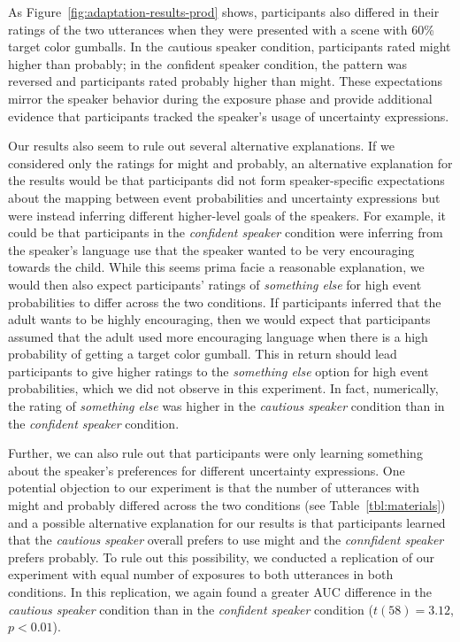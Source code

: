 \documentclass[lucida,biblatex]{sp} %
\begin{document}
As Figure~\ref{fig:adaptation-results-prod} shows, participants also differed in their ratings of the two utterances when they were presented with a scene with 60\% target color gumballs. In the {\emph cautious speaker} condition, participants rated {\sc might} higher than {\sc probably}; in the {\emph confident speaker} condition, the pattern was reversed and participants rated {\sc probably} higher than {\sc might}. These expectations mirror the speaker behavior during the exposure phase and provide additional evidence that participants tracked the speaker's usage of uncertainty expressions. 

Our results also seem to rule out several alternative explanations. If we  considered only the ratings for {\sc might} and {\sc probably}, an alternative explanation for the results would be that participants did not form speaker-specific expectations about the mapping between event probabilities and uncertainty expressions but were instead inferring different higher-level goals of the speakers. For example, it could be that participants in the \emph{confident speaker} condition were inferring from the speaker's language use that the speaker wanted to be very encouraging towards the child. While this seems prima facie a reasonable explanation, we would then also expect participants' ratings of \emph{ something else} for high event probabilities to differ across the two conditions. If participants inferred that the adult wants to be highly encouraging, then we would expect that participants assumed that the adult used more encouraging language when there is a high probability of getting a target color gumball. This in return should lead participants to give higher ratings to the \emph{something else} option for high event probabilities, which we did not observe in this experiment. In fact, numerically, the rating of \emph{something else} was higher in the \emph{cautious speaker} condition than in the \textit{confident speaker} condition.

Further, we can also rule out that participants were only learning something about the speaker's preferences for different uncertainty expressions. One potential objection to our experiment is that the number of utterances with {\sc might} and {\sc probably} differed across the two conditions (see Table~\ref{tbl:materials}) and a possible alternative explanation for our results is that participants learned that the {\it cautious speaker} overall prefers to use {\sc might} and the {\it connfident speaker} prefers {\sc probably}. To rule out this possibility, we conducted a replication of our experiment with equal number of exposures to both utterances in both conditions. In this replication, we again found a greater AUC difference in the \emph{cautious speaker} condition than in the \emph{confident speaker} condition ($t(58) = 3.12$, $p < 0.01$).
\end{document}
